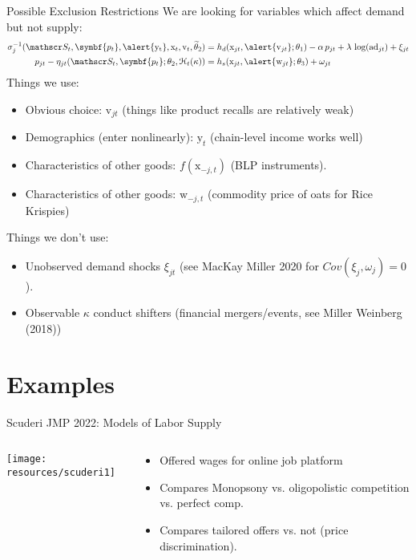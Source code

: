 \documentclass[aspectratio=169,10pt]{beamer}
\begin{document}
\begin{frame}{Possible Exclusion Restrictions}
We are looking for variables which affect \alert{demand but not supply}:
\begin{align*}
\sigma_{j}^{-1}(\calS_t, \symbf{p_t},\alert{\mathrm{y_t}}, \mathrm{x}_t,  \mathrm{v}_t, \widetilde{\theta}_2) 
&= h_d(\mathrm{x}_{jt},\alert{ \mathrm{v}_{jt}}; \theta_1) - \alpha\, p_{jt} + \lambda \, \log(\text{ad}_{jt})+ \xi_{jt} \\
p_{jt} - \eta_{jt}(\calS_t, \symbf{p_t}; \theta_2, \mathcal{H}_t(\kappa))
&= h_s(\textrm{x}_{jt}, \alert{\mathrm{w}_{jt}}; \theta_3) + \omega_{jt} 
\end{align*}
Things we use:
\begin{itemize}
    \item Obvious choice: $\mathrm{v}_{jt}$ (things like product recalls are relatively weak)
    \item Demographics (enter nonlinearly): $\mathrm{y}_t$ (chain-level income works well)
    \item Characteristics of other goods: $f(\mathrm{x}_{-j,t})$ (BLP instruments).
    \item Characteristics of other goods: $\mathrm{w}_{-j,t}$ (commodity price of oats for Rice Krispies)
\end{itemize}

Things we don't use:
\begin{itemize}
    \item Unobserved demand shocks $\xi_{jt}$ (see MacKay Miller 2020 for $Cov(\xi_j,\omega_j)=0$).
    \item Observable $\kappa$ conduct shifters (financial mergers/events, see Miller Weinberg (2018))
\end{itemize}
\end{frame}


\section{Examples}


\begin{frame}{Scuderi JMP 2022: Models of Labor Supply}
\begin{columns}
\begin{column}{0.7\textwidth}
\texttt{[image: resources/scuderi1]}
\end{column}
\begin{column}{0.3\textwidth}
\begin{itemize}
\item Offered wages for online job platform
\item Compares Monopsony vs. oligopolistic competition vs. perfect comp.
\item Compares tailored offers vs. not (price discrimination).
\end{itemize}
\end{column}
\end{columns}
\end{frame}
\end{document}
